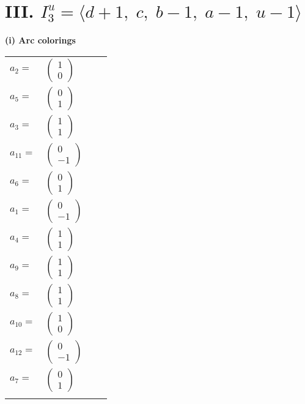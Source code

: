 \documentclass[1p]{elsarticle_modified}
\theoremstyle{definition}
\begin{document}
\centering \section*{III. $I^u_{3}= \langle d+1,\;c,\;b-1,\;a-1,\;u-1 \rangle$}
\flushleft \textbf{(i) Arc colorings}\\
\begin{tabular}{m{7pt} m{180pt} m{7pt} m{180pt} }
\flushright $a_{2}=$&$\begin{pmatrix}1\\0\end{pmatrix}$ \\
\flushright $a_{5}=$&$\begin{pmatrix}0\\1\end{pmatrix}$ \\
\flushright $a_{3}=$&$\begin{pmatrix}1\\1\end{pmatrix}$ \\
\flushright $a_{11}=$&$\begin{pmatrix}0\\-1\end{pmatrix}$ \\
\flushright $a_{6}=$&$\begin{pmatrix}0\\1\end{pmatrix}$ \\
\flushright $a_{1}=$&$\begin{pmatrix}0\\-1\end{pmatrix}$ \\
\flushright $a_{4}=$&$\begin{pmatrix}1\\1\end{pmatrix}$ \\
\flushright $a_{9}=$&$\begin{pmatrix}1\\1\end{pmatrix}$ \\
\flushright $a_{8}=$&$\begin{pmatrix}1\\1\end{pmatrix}$ \\
\flushright $a_{10}=$&$\begin{pmatrix}1\\0\end{pmatrix}$ \\
\flushright $a_{12}=$&$\begin{pmatrix}0\\-1\end{pmatrix}$ \\
\flushright $a_{7}=$&$\begin{pmatrix}0\\1\end{pmatrix}$\\&\end{tabular}
\end{document}
